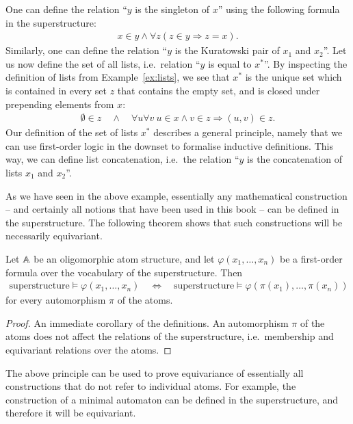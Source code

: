\begin{myexample}
One can define the relation ``$y$ is the singleton of $x$'' using the following formula in the superstructure: 
\begin{align*}
	x \in y \land \forall z (z \in y \Rightarrow z = x).
\end{align*}	
Similarly, one can define the relation ``$y$ is the Kuratowski pair of $x_1$ and $x_2$''. Let us now define the set of all lists, i.e.~relation ``$y$ is equal to $x^*$''.  By inspecting the definition of lists from Example~\ref{ex:lists}, we see that $x^*$ is the unique set which is  contained in every set $z$ that contains the empty set, and is closed under prepending elements from $x$: 
\begin{align*}
\emptyset \in z  \quad \land \quad
\forall u \forall v \ u \in x \land v \in z \Rightarrow (u,v) \in z.
\end{align*}
Our definition of the set of lists $x^*$ describes a general principle, namely that we can use first-order logic in the downset to formalise inductive definitions. 
This way, we can define list concatenation, i.e.~the relation ``$y$ is the concatenation of lists $x_1$ and $x_2$''. 
\end{myexample}
	
As we have seen in the above example, essentially any mathematical construction -- and certainly all notions that have been used in this book -- can be defined in the superstructure. The following theorem shows that such constructions will be necessarily equivariant.

	
\begin{theorem}
	\label{thm:equivariance-principle}
	Let $\mathbb A$ be an oligomorphic atom structure, and let $\varphi(x_1,\ldots,x_n)$ be a first-order formula over the vocabulary of the superstructure. Then 
	\begin{align*}
	\text{superstructure} \models \varphi(x_1,\ldots,x_n)
	\quad \Leftrightarrow \quad 
	\text{superstructure} \models \varphi(\pi(x_1),\ldots,\pi(x_n))
	\end{align*}
	for every automorphism $\pi$ of the atoms.
\end{theorem}
\begin{proof}
	An immediate corollary of the definitions. 
	An automorphism $\pi$ of the atoms does not affect the relations of the superstructure, i.e.~membership and equivariant relations over the atoms.
\end{proof}

The above principle can be used to prove equivariance of essentially all constructions that do not refer to individual atoms. For example, the construction of a minimal automaton can be defined in the superstructure, and therefore it will be equivariant.



